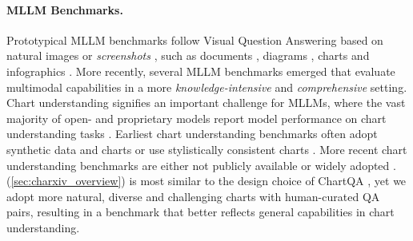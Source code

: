 \paragraph{MLLM Benchmarks. } Prototypical MLLM benchmarks follow Visual Question Answering based on natural images \cite{antol2015vqa, goyal2017making, hudson2019gqa, singh2019towards, marino2019ok} or \textit{screenshots} \cite{gao2024improving}, such as documents \cite{mathew2021docvqa}, diagrams \cite{kembhavi2016diagram}, charts \cite{masry2022chartqa} and infographics \cite{mathew2022infographicvqa}. More recently, several MLLM benchmarks emerged that evaluate multimodal capabilities in a more \emph{knowledge-intensive} \cite{lu2022learn, lu2024mathvista, yue2023mmmu} and \emph{comprehensive} \cite{yu2023mm, liu2024mmbench, fu2024mme} setting. Chart understanding signifies an important challenge for MLLMs, where the vast majority of open- and proprietary models \cite{openai2024gpt4, claude3, rekateam2024reka, bai2023qwenvl, team2023gemini} report model performance on chart understanding tasks \cite{lu2024mathvista, masry2022chartqa}. Earliest chart understanding benchmarks often adopt synthetic data and charts \cite{kahou2017figureqa, kafle2018dvqa, methani2020plotqa} or use stylistically consistent charts \cite{masry2022chartqa}. More recent chart understanding benchmarks are either not publicly available \cite{liu2024mmc, xu2024chartbench} or widely adopted \cite{xia2024chartx}. \ours{} (\cref{sec:charxiv_overview}) is most similar to the design choice of ChartQA \cite{masry2022chartqa}, yet we adopt more natural, diverse and challenging charts with human-curated QA pairs, resulting in a benchmark that better reflects general capabilities in chart understanding.